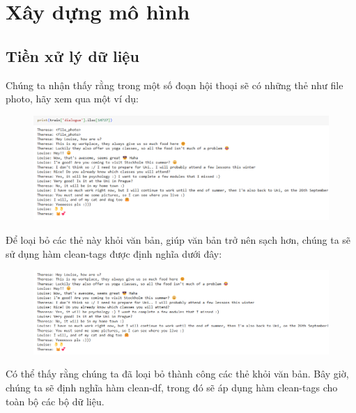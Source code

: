 \chapter{Xây dựng mô hình}
\label{Chapter3}
\section{Tiền xử lý dữ liệu}

Chúng ta nhận thấy rằng trong một số đoạn hội thoại sẽ có những thẻ như file photo, hãy xem qua một ví dụ:\\

\begin{figure}[htp]
    \centering
    \includegraphics[scale=.6]{images/vd1.png}
    \end{figure}

Để loại bỏ các thẻ này khỏi văn bản, giúp văn bản trở nên sạch hơn, chúng ta sẽ sử dụng hàm clean-tags được định nghĩa dưới đây:\\




\begin{figure}[htp]
    \centering
    \includegraphics[scale=.6]{images/ketqua.png}
    \end{figure}

Có thể thấy rằng chúng ta đã loại bỏ thành công các thẻ khỏi văn bản. Bây giờ, chúng ta sẽ định nghĩa hàm clean-df, trong đó sẽ áp dụng hàm clean-tags cho toàn bộ 
các bộ dữ liệu.\\



